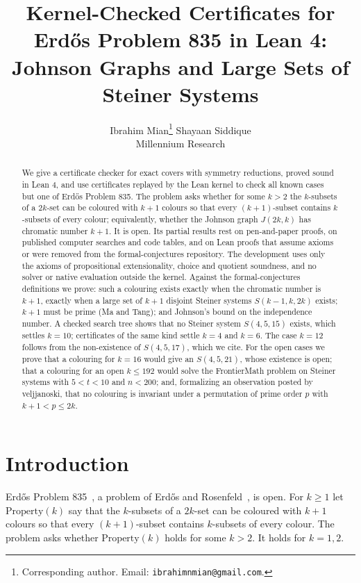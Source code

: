 \documentclass[11pt]{article}
\title{Kernel-Checked Certificates for Erd\H{o}s Problem 835 in Lean 4:\\ Johnson Graphs and Large Sets of Steiner Systems}
\author{Ibrahim Mian\thanks{Corresponding author. Email: \texttt{ibrahimnmian@gmail.com}.} \qquad Shayaan Siddique\\[2pt]
\normalsize Millennium Research}
\date{}
\theoremstyle{plain}
\begin{document}
\maketitle

\begin{abstract}
We give a certificate checker for exact covers with symmetry reductions, proved sound in Lean 4, and use certificates replayed by the Lean kernel to check all known cases but one of Erd\H{o}s Problem 835. The problem asks whether for some $k>2$ the $k$-subsets of a $2k$-set can be coloured with $k+1$ colours so that every $(k+1)$-subset contains $k$-subsets of every colour; equivalently, whether the Johnson graph $J(2k,k)$ has chromatic number $k+1$. It is open. Its partial results rest on pen-and-paper proofs, on published computer searches and code tables, and on Lean proofs that assume axioms or were removed from the formal-conjectures repository. The development uses only the axioms of propositional extensionality, choice and quotient soundness, and no solver or native evaluation outside the kernel. Against the formal-conjectures definitions we prove: such a colouring exists exactly when the chromatic number is $k+1$, exactly when a large set of $k+1$ disjoint Steiner systems $S(k-1,k,2k)$ exists; $k+1$ must be prime (Ma and Tang); and Johnson's bound on the independence number. A checked search tree shows that no Steiner system $S(4,5,15)$ exists, which settles $k=10$; certificates of the same kind settle $k=4$ and $k=6$. The case $k=12$ follows from the non-existence of $S(4,5,17)$, which we cite. For the open cases we prove that a colouring for $k=16$ would give an $S(4,5,21)$, whose existence is open; that a colouring for an open $k \le 192$ would solve the FrontierMath problem on Steiner systems with $5<t<10$ and $n<200$; and, formalizing an observation posted by veljjanoski, that no colouring is invariant under a permutation of prime order $p$ with $k+1<p\le 2k$.
\end{abstract}

\section{Introduction}\label{sec:intro}

Erd\H{o}s Problem 835~\cite{EP835}, a problem of Erd\H{o}s and Rosenfeld~\cite{Er74}, is open. For $k \ge 1$ let $\mathrm{Property}(k)$ say that the $k$-subsets of a $2k$-set can be coloured with $k+1$ colours so that every $(k+1)$-subset contains $k$-subsets of every colour. The problem asks whether $\mathrm{Property}(k)$ holds for some $k>2$. It holds for $k=1,2$.
\end{document}
